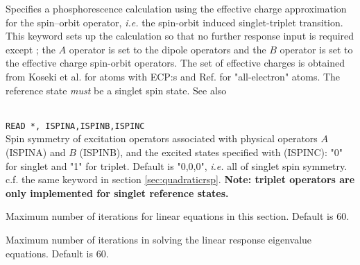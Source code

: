 \begin{description}
\item{}
Specifies a phosphorescence calculation using
the effective charge approximation for the spin--orbit operator, {\it i.e.\/}
the spin-orbit
induced singlet-triplet transition. This keyword sets up the
calculation so that no further response input is required except ; the
$A$ operator is set to the dipole operators and
the $B$ operator
is set to the effective charge spin-orbit
operators. The set of effective charges is obtained from Koseki et al.
\cite{skmsgmwsnm99,skmwsmsgjpca102} for atoms with ECP:s and Ref.\cite{skmwsmsgjpc96} for "all-electron" atoms.
The reference state {\em must} be a singlet spin state. See  also 


\item{}\\
\verb|READ *, ISPINA,ISPINB,ISPINC|\\
Spin symmetry of excitation operators associated with physical operators $A$ (ISPINA) and $B$ (ISPINB),
and the excited states specified with  (ISPINC): "0" for singlet and "1" for triplet.
Default is "0,0,0", {\it i.e.\/} all of singlet spin symmetry.
c.f. the same keyword in section \ref{sec:quadraticrsp}.
{\bf Note: triplet operators are only implemented for singlet reference states.}

\item{}
Maximum number of iterations for linear equations in this section.
Default is 60.

\item{}
Maximum number of iterations in solving the linear
response eigenvalue
equations.
Default is 60.


\end{description}
